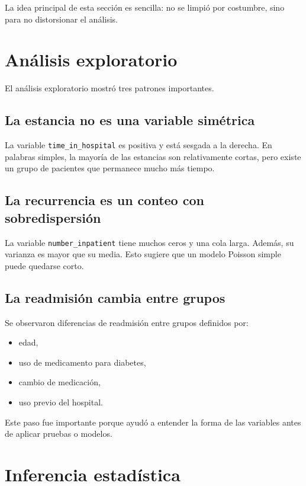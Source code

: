 \documentclass[12pt]{article}
\begin{document}
La idea principal de esta sección es sencilla: no se limpió por costumbre, sino para no distorsionar el análisis.

\section{Análisis exploratorio}

El análisis exploratorio mostró tres patrones importantes.

\subsection{La estancia no es una variable simétrica}

La variable \texttt{time\_in\_hospital} es positiva y está sesgada a la derecha. En palabras simples, la mayoría de las estancias son relativamente cortas, pero existe un grupo de pacientes que permanece mucho más tiempo.

\subsection{La recurrencia es un conteo con sobredispersión}

La variable \texttt{number\_inpatient} tiene muchos ceros y una cola larga. Además, su varianza es mayor que su media. Esto sugiere que un modelo Poisson simple puede quedarse corto.

\subsection{La readmisión cambia entre grupos}

Se observaron diferencias de readmisión entre grupos definidos por:
\begin{itemize}[leftmargin=1.6em]
    \item edad,
    \item uso de medicamento para diabetes,
    \item cambio de medicación,
    \item uso previo del hospital.
\end{itemize}

Este paso fue importante porque ayudó a entender la forma de las variables antes de aplicar pruebas o modelos.

\section{Inferencia estadística}
\end{document}
